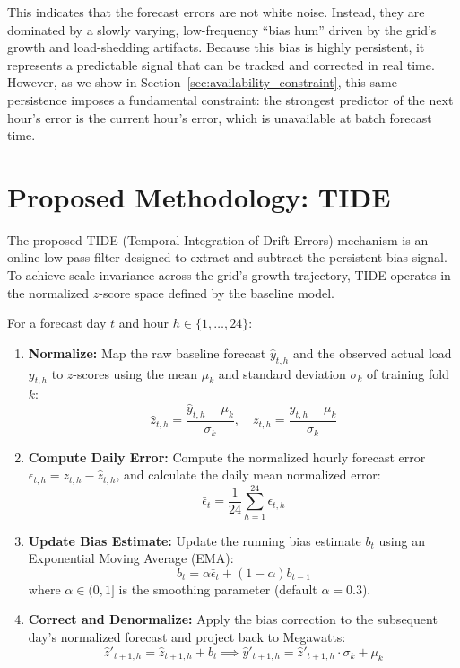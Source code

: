 \documentclass[11pt,letterpaper]{article}
\begin{document}
This indicates that the forecast errors are not white noise. Instead, they are dominated by a slowly varying, low-frequency ``bias hum'' driven by the grid's growth and load-shedding artifacts. Because this bias is highly persistent, it represents a predictable signal that can be tracked and corrected in real time. However, as we show in Section~\ref{sec:availability_constraint}, this same persistence imposes a fundamental constraint: the strongest predictor of the next hour's error is the current hour's error, which is unavailable at batch forecast time.

\section{Proposed Methodology: TIDE}
\label{sec:tide}
The proposed TIDE (Temporal Integration of Drift Errors) mechanism is an online low-pass filter designed to extract and subtract the persistent bias signal. To achieve scale invariance across the grid's growth trajectory, TIDE operates in the normalized $z$-score space defined by the baseline model.

For a forecast day $t$ and hour $h \in \{1, \dots, 24\}$:
\begin{enumerate}
    \item \textbf{Normalize:} Map the raw baseline forecast $\hat{y}_{t,h}$ and the observed actual load $y_{t,h}$ to $z$-scores using the mean $\mu_k$ and standard deviation $\sigma_k$ of training fold $k$:
    \begin{equation}
    \hat{z}_{t,h} = \frac{\hat{y}_{t,h} - \mu_k}{\sigma_k}, \quad z_{t,h} = \frac{y_{t,h} - \mu_k}{\sigma_k}
    \end{equation}
    
    \item \textbf{Compute Daily Error:} Compute the normalized hourly forecast error $\epsilon_{t,h} = z_{t,h} - \hat{z}_{t,h}$, and calculate the daily mean normalized error:
    \begin{equation}
    \bar{\epsilon}_t = \frac{1}{24} \sum_{h=1}^{24} \epsilon_{t,h}
    \end{equation}
    
    \item \textbf{Update Bias Estimate:} Update the running bias estimate $b_t$ using an Exponential Moving Average (EMA):
    \begin{equation}
    b_t = \alpha \bar{\epsilon}_t + (1 - \alpha) b_{t-1}
    \end{equation}
    where $\alpha \in (0, 1]$ is the smoothing parameter (default $\alpha = 0.3$).
    
    \item \textbf{Correct and Denormalize:} Apply the bias correction to the subsequent day's normalized forecast and project back to Megawatts:
    \begin{equation}
    \hat{z}'_{t+1,h} = \hat{z}_{t+1,h} + b_t \implies \hat{y}'_{t+1,h} = \hat{z}'_{t+1,h} \cdot \sigma_k + \mu_k
    \end{equation}
\end{enumerate}
\end{document}
